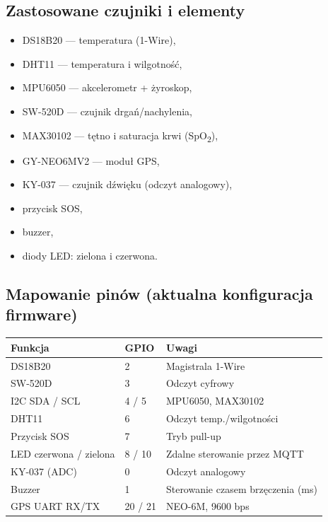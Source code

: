 \documentclass[a4paper,12pt]{article}
\begin{document}
\subsection{Zastosowane czujniki i elementy}
\begin{itemize}
  \item DS18B20 --- temperatura (1-Wire),
  \item DHT11 --- temperatura i wilgotność,
  \item MPU6050 --- akcelerometr + żyroskop,
  \item SW-520D --- czujnik drgań/nachylenia,
  \item MAX30102 --- tętno i saturacja krwi (SpO\textsubscript{2}),
  \item GY-NEO6MV2 --- moduł GPS,
  \item KY-037 --- czujnik dźwięku (odczyt analogowy),
  \item przycisk SOS,
  \item buzzer,
  \item diody LED: zielona i czerwona.
\end{itemize}

\subsection{Mapowanie pinów (aktualna konfiguracja firmware)}
\begin{longtable}{|>{\raggedright\arraybackslash}p{5cm}|p{3cm}|p{6cm}|}
\hline
\textbf{Funkcja} & \textbf{GPIO} & \textbf{Uwagi} \\
\hline
DS18B20 & 2 & Magistrala 1-Wire \\
\hline
SW-520D & 3 & Odczyt cyfrowy \\
\hline
I2C SDA / SCL & 4 / 5 & MPU6050, MAX30102 \\
\hline
DHT11 & 6 & Odczyt temp./wilgotności \\
\hline
Przycisk SOS & 7 & Tryb pull-up \\
\hline
LED czerwona / zielona & 8 / 10 & Zdalne sterowanie przez MQTT \\
\hline
KY-037 (ADC) & 0 & Odczyt analogowy \\
\hline
Buzzer & 1 & Sterowanie czasem brzęczenia (ms) \\
\hline
GPS UART RX/TX & 20 / 21 & NEO-6M, 9600 bps \\
\hline
\end{longtable}
\end{document}
